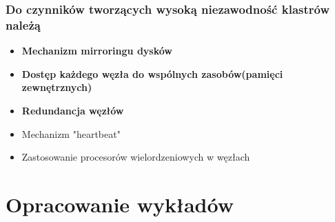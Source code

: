 \documentclass[a4paper,twoside]{article}
\begin{document}
\section{Do czynników tworzących wysoką niezawodność klastrów należą}
	\begin{itemize}
    \item \textbf{Mechanizm mirroringu dysków}
    \item \textbf{Dostęp każdego węzła do wspólnych zasobów(pamięci zewnętrznych)}
    \item \textbf{Redundancja węzłów}
    \item Mechanizm "heartbeat"
    \item Zastosowanie procesorów wielordzeniowych w węzłach
    \end{itemize}

\newpage
\part*{Opracowanie wykładów}
\end{document}
